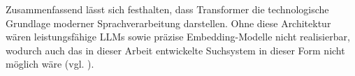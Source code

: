 Zusammenfassend lässt sich festhalten, dass Transformer die technologische Grundlage moderner Sprachverarbeitung darstellen. Ohne diese Architektur wären leistungsfähige LLMs sowie präzise Embedding-Modelle nicht realisierbar, wodurch auch das in dieser Arbeit entwickelte Suchsystem in dieser Form nicht möglich wäre (vgl. \cite{Attention-Is-All-You-Need,brown2020language,touvron2023llama,nandakumar2023specter2}).
